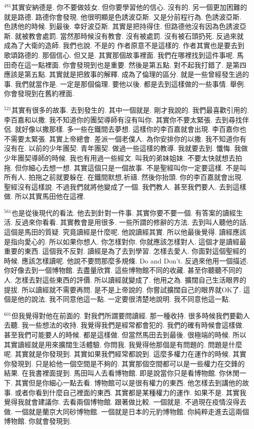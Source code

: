 \documentclass{book}
\begin{document}
$^{481}$其實安納德是.
你不要做妓女.
但你要學習他的信心.
沒有的.
另一個更加困難的就是路德.
路德你會發現.
他很明顯是色誘波亞斯.
又是分前程行為.
色誘波亞斯.
色誘他的時候.
到最後.
幸好波亞斯.
其實是把持得住.
但路德他沒有因為色誘波亞斯.
就被教會處罰.
當然那時候沒有教會.
沒有被處罰.
沒有被石頭扔死.
反過來就成為了大衛的造師.
我們也說.
不是的 作者原意不是這樣的.
作者其實也是要去到歌頌路德的.
那個信心.
但又是.
其實那個故事裡面.
我們在哪裡找到這件事呢.
馬田奇在這一點裡面.
你會發現到也是重要.
然後是第五點.
對不起我打錯了.
是第四 應該是第五點.
其實就是把敘事的解釋.
成為了倫理的區分.
就是一些曾經發生過的事.
我們就當作是.
一定是那個倫理.
要他以後.
都是去到這樣做的一些事情.
舉例.
你會發現到在舊約裡面.

$^{521}$其實有很多的故事.
去到發生的.
其中一個就是.
剛才我說的.
我們最喜歡引用的.
李百嘉和以撒.
我不知道你的團契導師有沒有叫你.
其實你不要太緊張.
去到尋找伴侶.
就好像以撒那樣.
多一些在鐵間去夢想.
這樣你的李百嘉就會出現.
李百嘉你也不需要太緊張.
其實上帝總會.
差派一個老僕人.
為你安排你的以撒.
我不知道你有沒有在.
以前的少年團契.
青年團契.
做過一些這樣的教導.
我就要去到.
懺悔.
我做少年團契導師的時候.
我也有用過一些經文.
叫我的弟妹姐妹.
不要太快就想去拍拖.
但你細心去想一想.
其實這個只是一個故事.
不是聖經叫你一定要這樣.
不是叫所有人.
拍拖之前就要躲在.
在鐵間默想,祈禱.
然後你抬頭.
你的李百嘉就會出現.
聖經沒有這樣說.
不過我們就將他變成了一個.
我們教人.
甚至我們要人.
去到這樣做.
所以其實馬田他在這裡.

$^{561}$也是從後現代的看法.
他去到針對一件事.
其實你要不要一個.
有答案的讀經生活.
反過來你看看.
其實教會是用很多.
一些所謂的修辭的方法.
去到叫人聽他的話.
這個是馬田的質疑.
究竟讀經是什麼呢.
他說讀經其實.
所以他最後覺得.
讀經應該是指向愛心的.
所以如果你想人.
你怎樣對你.
你就應該怎樣對人.
這個才是讀經最重要的東西.
這個我不反對.
讀經是為了去到學習.
怎樣去愛人.
你面對這個聖經的時候.
應該怎樣讀呢.
他說不要問那麼多規條.
Do and Don't.
反過來他用一個描述.
你好像去到一個博物館.
去盡量欣賞.
這些博物館不同的收藏.
甚至你聽聽不同的人.
怎樣去對這些東西的評價.
所以讀經就變成了.
他用之為.
擴闊自己生活眼界的提拔.
所以讀經就不需要再問.
是不是上帝說的.
你嘗試擴闊自己的眼界就OK了.
這個是他的說法.
我不同意他這一點.
一定要很清楚地說明.
我不同意他這一點.

$^{601}$但我覺得對他在前面的.
對我們所謂要問讀經.
那一種收持.
很多時候我們要勸人去聽.
我一些想法的收持.
我覺得我們是經常都會犯的.
我們的確有時候會這樣做.
甚至我們可能要人的時候.
都是這樣做.
但當然馬田去到最後.
很極端的時候.
所以其實讀經就是用來擴闊生活體驗.
你問我.
我覺得他那個是有問題的.
問題是什麼呢.
其實就是你發現到.
其實如果我們經常都說到.
這麼多權力在運作的時候.
其實你發現到.
只是給他一個空間是不夠的.
其實那個空間都可以是一些權力在交鋒的結果.
在我書裡面提到.
馬田叫人去看博物館.
即是說當你只是看博物館.
你休閒一下.
其實但是你細心一點去看.
博物館可以是很有權力的東西.
他怎樣去到講他的故事.
或者你看到什麼自己裡面的東西.
其實都是某種權力的運作.
如果不是.
其實我覺得我就會建議你.
去看兩個博物館.
跟著做比較.
一個就是.
不過現在疫情沒得去做.
一個就是蘭京大同砂博物館.
一個就是日本的元豹博物館.
你純粹走進去這兩個博物館.
你就會發現到.
\end{document}

